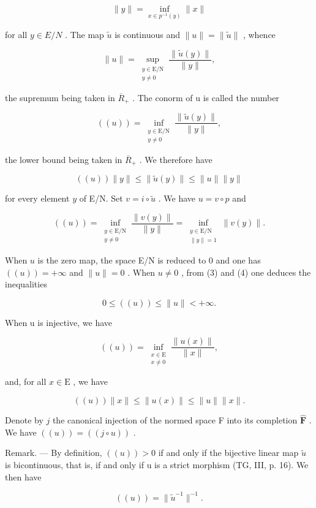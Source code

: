 \[
\| y \| = \inf _ {x \in p^{-1}(y)} \| x \|\tag{2}
\]

for all \(y \in E/N\) . The map \(\widetilde{u}\) is continuous and \(\|u\| = \|\widetilde{u}\|\) , whence

\[
\| u\| = \sup_{\substack{y\in \mathrm{E / N}\\ y\neq 0}}\frac{\|\widetilde{u} (y)\|}{\|y\|},\tag{3}
\]

the supremum being taken in \(\overline{R}_{+}\) . The conorm of u is called the number

\[
((u)) = \inf_{\substack{y\in \mathrm{E} / \mathrm{N}\\ y\neq 0}}\frac{\| \widetilde{u}(y)\|}{\|y\|},\tag{4}
\]

the lower bound being taken in \(\overline{R}_{+}\) . We therefore have

\[
((u)) \| y \| \leqslant \| \widetilde {u} (y) \| \leqslant \| u \| \| y \|\tag{5}
\]

for every element \(y\) of E/N. Set \(v = i \circ \widetilde{u}\) . We have \(u = v \circ p\) and

\[
((u)) = \inf_{\substack{y\in \mathrm{E / N}\\ y\neq 0}}\frac{\|v(y)\|}{\|y\|} = \inf_{\substack{y\in \mathrm{E / N}\\ \|y\| = 1}}\| v(y)\| .\tag{6}
\]

When \(u\) is the zero map, the space E/N is reduced to 0 and one has \(((u)) = +\infty\) and \(\| u \| = 0\) . When \(u \neq 0\) , from (3) and (4) one deduces the inequalities

\[
0 \leqslant ((u)) \leqslant \| u \| <   + \infty .\tag{7}
\]

When u is injective, we have

\[
((u)) = \inf_{\substack{x\in \mathrm{E}\\ x\neq 0}}\frac{\|u(x)\|}{\|x\|},\tag{8}
\]

and, for all \(x \in \mathrm{E}\) , we have

\[
((u)) \| x \| \leqslant \| u (x) \| \leqslant \| u \| \| x \|.\tag{9}
\]

Denote by \(j\) the canonical injection of the normed space F into its completion \(\widehat{\mathbf{F}}\) . We have \(((u)) = ((j \circ u))\) .

Remark. --- By definition, \(((u)) > 0\) if and only if the bijective linear map \(\widetilde{u}\) is bicontinuous, that is, if and only if u is a strict morphism (TG, III, p. 16). We then have

\[
((u)) = \| \widetilde {u} ^ {- 1} \| ^ {- 1}.\tag{10}
\]

